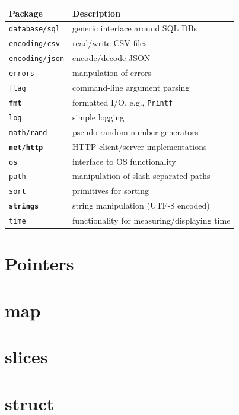 \documentclass{article}
\begin{document}
\begin{multicols*}{3}
  \begin{tabular}{p{0.8in}p{2.2in}}
    \toprule
    \textbf{Package} & \textbf{Description} \\
    \midrule
    \texttt{database/sql} & generic interface around SQL DBs \\
    \texttt{encoding/csv} & read/write CSV files \\
    \texttt{encoding/json} & encode/decode JSON \\
    \texttt{errors} & manpulation of errors \\
    \texttt{flag} & command-line argument parsing \\
    \textbf{\texttt{fmt}} & formatted I/O, e.g., \texttt{Printf} \\
    \texttt{log} & simple logging\\
    \texttt{math/rand} & pseudo-random number generators \\
    \textbf{\texttt{net/http}} & HTTP client/server implementations \\
    \texttt{os} & interface to OS functionality \\
    \texttt{path} & manipulation of slash-separated paths \\
    \texttt{sort} & primitives for sorting \\
    \textbf{\texttt{strings}} & string manipulation (UTF-8 encoded) \\
    \texttt{time} & functionality for measuring/displaying time \\
    \bottomrule
  \end{tabular}

  \filbreak
  \section*{Pointers}

  \filbreak
  \section*{map}

  \filbreak
  \section*{slices}

  \filbreak
  \section*{struct}

  \filbreak

\end{multicols*}
\end{document}
